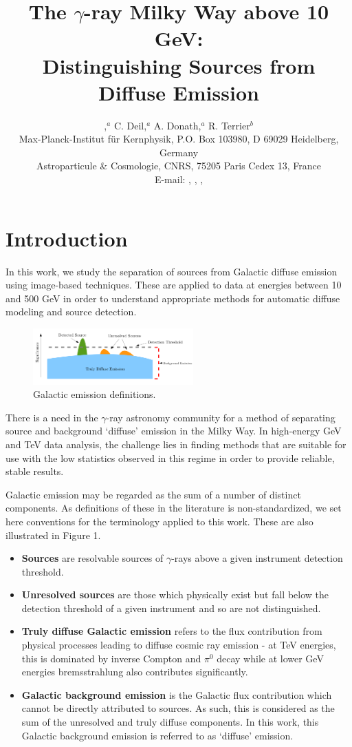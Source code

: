 \documentclass{PoS}
\title{The $\gamma$-ray Milky Way above 10 GeV:\\
Distinguishing Sources from Diffuse Emission}
\author{\speaker{E. Owen},$^a$ C. Deil,$^{a}$ A. Donath,$^{a}$ R. Terrier$^{b}$\\
\llap{$^a$}Max-Planck-Institut f\"{u}r Kernphysik, P.O. Box 103980, D
69029 Heidelberg, Germany\\
\llap{$^b$}Astroparticule \& Cosmologie, CNRS, 75205 Paris Cedex 13, France\\
E-mail: \email{ellis.owen@mpi-hd.mpg.de}, \email{christoph.deil@mpi-hd.mpg.de}, \email{axel.donath@mpi-hd.mpg.de}, \email{terrier@apc.univ-paris7.fr}}
\begin{document}
\section{Introduction}

In this work, we study the separation of sources from Galactic diffuse emission using image-based techniques. These are applied to data at energies between 10 and 500 GeV in order to understand appropriate methods for automatic diffuse modeling and source detection.

\begin{figure}
\vspace{-10pt}
  \centering
      \includegraphics[width=0.55\textwidth]{figures/definitions.png}
  \caption{Galactic emission definitions.}
\vspace{-15pt}
\end{figure}

There is a need in the $\gamma$-ray astronomy community for a method of separating source and background `diffuse' emission in the Milky Way. In high-energy GeV and TeV data analysis, the challenge lies in finding methods that are suitable for use with the low statistics observed in this regime in order to provide reliable, stable results.

Galactic emission may be regarded as the sum of a number of distinct components. As definitions of these in the literature is non-standardized, we set here conventions for the terminology applied to this work. These are also illustrated in Figure 1.

\begin{itemize}[noitemsep,nolistsep]
\item \textbf{Sources} are resolvable sources of $\gamma$-rays above a given instrument detection threshold.
\item \textbf{Unresolved sources} are those which physically exist but fall below the detection threshold of a given instrument and so are not distinguished.
\item \textbf{Truly diffuse Galactic emission} refers to the flux contribution from physical processes leading to diffuse cosmic ray emission - at TeV energies, this is dominated by inverse Compton and $\pi^0$ decay while at lower GeV energies bremsstrahlung also contributes significantly.
\item \textbf{Galactic background emission} is the Galactic flux contribution which cannot be directly attributed to sources. As such, this is considered as the sum of the unresolved and truly diffuse components. In this work, this Galactic background emission is referred to as `diffuse' emission.
\end{itemize}
\end{document}
